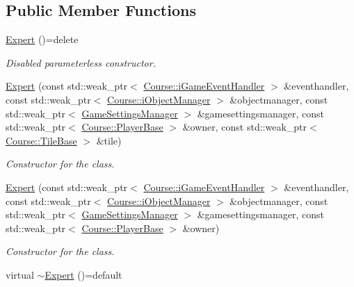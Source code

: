 \subsection*{Public Member Functions}
\begin{DoxyCompactItemize}
\item 
\hypertarget{class_student_1_1_expert_a797a86567792b100caa002c831751c4f}{\hyperlink{class_student_1_1_expert_a797a86567792b100caa002c831751c4f}{Expert} ()=delete}\label{class_student_1_1_expert_a797a86567792b100caa002c831751c4f}

\begin{DoxyCompactList}\small\item\em Disabled parameterless constructor. \end{DoxyCompactList}\item 
\hyperlink{class_student_1_1_expert_a84882a44459039bdc831f6a719af18bc}{Expert} (const std\-::weak\-\_\-ptr$<$ \hyperlink{class_course_1_1i_game_event_handler}{Course\-::i\-Game\-Event\-Handler} $>$ \&eventhandler, const std\-::weak\-\_\-ptr$<$ \hyperlink{class_course_1_1i_object_manager}{Course\-::i\-Object\-Manager} $>$ \&objectmanager, const std\-::weak\-\_\-ptr$<$ \hyperlink{class_student_1_1_game_settings_manager}{Game\-Settings\-Manager} $>$ \&gamesettingsmanager, const std\-::weak\-\_\-ptr$<$ \hyperlink{class_course_1_1_player_base}{Course\-::\-Player\-Base} $>$ \&owner, const std\-::weak\-\_\-ptr$<$ \hyperlink{class_course_1_1_tile_base}{Course\-::\-Tile\-Base} $>$ \&tile)
\begin{DoxyCompactList}\small\item\em Constructor for the class. \end{DoxyCompactList}\item 
\hyperlink{class_student_1_1_expert_a9632eb520f3d33137b1324441e297b82}{Expert} (const std\-::weak\-\_\-ptr$<$ \hyperlink{class_course_1_1i_game_event_handler}{Course\-::i\-Game\-Event\-Handler} $>$ \&eventhandler, const std\-::weak\-\_\-ptr$<$ \hyperlink{class_course_1_1i_object_manager}{Course\-::i\-Object\-Manager} $>$ \&objectmanager, const std\-::weak\-\_\-ptr$<$ \hyperlink{class_student_1_1_game_settings_manager}{Game\-Settings\-Manager} $>$ \&gamesettingsmanager, const std\-::weak\-\_\-ptr$<$ \hyperlink{class_course_1_1_player_base}{Course\-::\-Player\-Base} $>$ \&owner)
\begin{DoxyCompactList}\small\item\em Constructor for the class. \end{DoxyCompactList}\item 
\hypertarget{class_student_1_1_expert_a65197de677d6467ccb39cb9d000dacb0}{virtual \hyperlink{class_student_1_1_expert_a65197de677d6467ccb39cb9d000dacb0}{$\sim$\-Expert} ()=default}\label{class_student_1_1_expert_a65197de677d6467ccb39cb9d000dacb0}


\end{DoxyCompactItemize}
